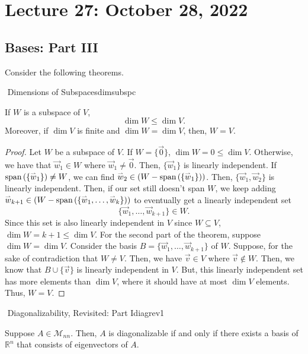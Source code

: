 \pagebreak

\section{Lecture 27: October 28, 2022}

    \subsection{Bases: Part III}

        Consider the following theorems.
        \begin{theorem}{\Stop\,\,Dimensions of Subspaces}{dimsubspc}

            If \(W\) is a subspace of \(V\),
            \begin{equation*}
                \dim W\leq \dim V.
            \end{equation*}
            Moreover, if \(\dim V\) is finite and \(\dim W=\dim V\), then, \(W=V\).
            \begin{proof}
                Let \(W\) be a subspace of \(V\). If \(W=\{\vec{0}\}\), \(\dim W=0\leq\dim V\). Otherwise, we have that \(\vec{w}_1\in W\) where \(\vec{w}_1\neq\vec{0}\). Then, \(\{\vec{w}_1\}\) is linearly independent. If \(\text{span\,}(\{\overset{_{\rightharpoonup}}{w}_1\})\neq W\), we can find \(\overset{_{\rightharpoonup}}{w}_2\in (W-\text{span\,}(\{\overset{_{\rightharpoonup}}{w}_1\}))\). Then, \(\{\vec{w}_1,\vec{w}_2\}\) is linearly independent. Then, if our set still doesn't span \(W\), we keep adding \(\overset{_{\rightharpoonup}}{w}_{k+1}\in (W-\text{span\,}(\{\overset{_{\rightharpoonup}}{w}_1,\ldots,\overset{_{\rightharpoonup}}{w}_k\}))\) to eventually get a linearly independent set
                \begin{equation*}
                    \{\vec{w}_1,\ldots,\vec{w}_{k+1}\}\in W.
                \end{equation*}
                Since this set is also linearly independent in \(V\) since \(W\subseteq V\), \(\dim W=k+1\leq \dim V\). For the second part of the theorem, suppose \(\dim W=\dim V\). Consider the basis \(B=\{\vec{w}_1,\ldots,\vec{w}_{k+1}\}\) of \(W\). Suppose, for the sake of contradiction that \(W\neq V\). Then, we have \(\vec{v}\in V\) where \(\vec{v}\nin W\). Then, we know that \(B\cup\{\vec{v}\}\) is linearly independent in \(V\). But, this linearly independent set has more elements than \(\dim V\), where it should have at most \(\dim V\) elements. Thus, \(W=V\).
            \end{proof}
            
        \end{theorem}
        \begin{theorem}{\Stop\,\,Diagonalizability, Revisited: Part I}{diagrev1}

            Suppose \(A\in\mathcal{M}_{nn}\). Then, \(A\) is diagonalizable if and only if there exists a basis of \(\mathbb{R}^n\) that consists of eigenvectors of \(A\).
            
        \end{theorem}
